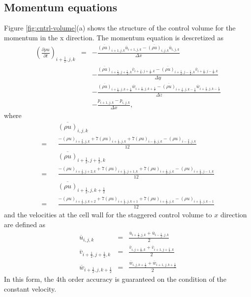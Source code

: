 \subsection{Momentum equations}
Figure \ref{fig:cntrl-volume}(a) shows the structure of the control volume for the momentum
in the x direction.
The momentum equation is descretized as
\begin{eqnarray}
\left(\frac{\partial \rho u}{\partial t}\right)_{i+\frac{1}{2},j,k}
&=& - \frac{\overline{(\rho u)}_{i+1,j,k} \overline{u}_{i+1,j,k}
           -\overline{(\rho u)}_{i,j,k} \overline{u}_{i,j,k}}
     {\Delta x}\nonumber\\
& & - \frac{\overline{(\rho u)}_{i+\frac{1}{2},j+\frac{1}{2},k}  \overline{v}_{i+\frac{1}{2},j+\frac{1}{2},k}
           -\overline{(\rho u)}_{i+\frac{1}{2},j-\frac{1}{2},k}  \overline{v}_{i+\frac{1}{2},j-\frac{1}{2},k}}
     {\Delta y}\nonumber\\
& & - \frac{\overline{(\rho u)}_{i+\frac{1}{2},j,k+\frac{1}{2}}  \overline{w}_{i+\frac{1}{2},j,k+\frac{1}{2}}
           -\overline{(\rho u)}_{i+\frac{1}{2},j,k-\frac{1}{2}}  \overline{w}_{i+\frac{1}{2},j,k-\frac{1}{2}}}
     {\Delta z}\nonumber\\
& & -\frac{p_{i+1,j,k}-p_{i,j,k}}{\Delta x},
\end{eqnarray}
where
\begin{eqnarray}
&& \overline{(\rho u)}_{i,j,k} \nonumber\\
= && \frac{-(\rho u)_{i+\frac{3}{2},j,k}+7(\rho u)_{i+\frac{1}{2},j,k}+7(\rho u)_{i-\frac{1}{2},j,k}-(\rho u)_{i-\frac{3}{2},j,k}}{12}\\
&& \overline{(\rho u)}_{i+\frac{1}{2},j+\frac{1}{2},k} \nonumber\\
= && \frac{-(\rho u)_{i+\frac{1}{2},j+2,k}+7(\rho u)_{i+\frac{1}{2},j+1,k}+7(\rho u)_{i+\frac{1}{2},j,k}-(\rho u)_{i+\frac{1}{2},j-1,k}}{12}\\
&& \overline{(\rho u)}_{i+\frac{1}{2},j,k+\frac{1}{2}} \nonumber\\
= &&\frac{-(\rho u)_{i+\frac{1}{2},j,k+2}+7(\rho u)_{i+\frac{1}{2},j,k+1}+7(\rho u)_{i+\frac{1}{2},j,k}-(\rho u)_{i+\frac{1}{2},j,k-1}}{12}
\end{eqnarray}
and the velocities at the cell wall for the staggered control volume to $x$ direction are
defined as
\begin{eqnarray}
\overline{u}_{i,j,k} &=& \frac{\overline{u}_{i+\frac{1}{2},j,k}+\overline{u}_{i-\frac{1}{2},j,k}}{2}\\
\overline{v}_{i+\frac{1}{2},j+\frac{1}{2},k} &=&
\frac{\overline{v}_{i,j+\frac{1}{2},k}+\overline{v}_{i+1,j+\frac{1}{2},k}}{2}\\
\overline{w}_{i+\frac{1}{2},j,k+\frac{1}{2}} &=&
\frac{\overline{w}_{i,j,k+\frac{1}{2}}+\overline{w}_{i+1,j,k+\frac{1}{2}}}{2}
\end{eqnarray}
In this form, the 4th order accuracy is guaranteed
on the condition of the constant velocity.

